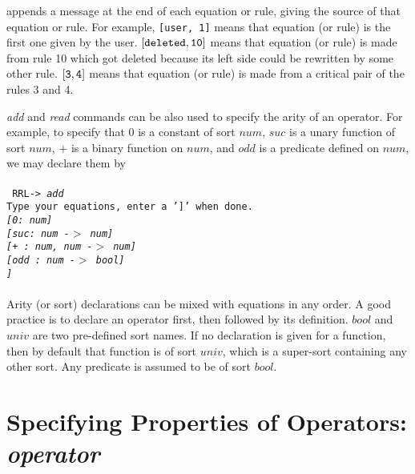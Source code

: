 \RRL appends a
message at the end of each equation or rule, giving the source of
that equation or rule. For example, {\tt [user, 1]} means that
equation (or rule) is the first one given by the user. ${\tt [deleted, 10]}$
means that equation (or rule) is made from rule 10 which
got deleted because its left side could be rewritten
by some other rule. ${\tt
{[3, 4]}}$ means that equation (or rule) is made from a critical pair of
the rules 3 and 4.

{\em add} and {\em read} commands can be also used to specify
the arity of an operator. For example, to specify that $0$ is a constant
of sort $num$, $suc$ is a unary function of sort $num$, 
$+$ is a binary function on $num$, and $odd$
is a predicate defined on $num$, we may declare them by \\ 
\\ 
{\tt 
RRL-> {\em add}\\
Type your equations, enter a ']' when done.\\
\em {[0: num]} \\
{[suc: num -$>$ num]} \\
{[+ : num, num -$>$ num]} \\
{[odd : num -$>$ bool]} \\
]} \\ \\
Arity (or sort) declarations can be mixed with equations in any order.
A good practice is to declare an operator first, then followed by
its definition. $bool$ and $univ$ are two pre-defined sort names.
If no declaration is given for a function, then by default
that function is of sort $univ$, which is a super-sort containing any other
sort. Any predicate is assumed to be of sort $bool$.

\section{Specifying Properties of Operators: {\em operator}}

